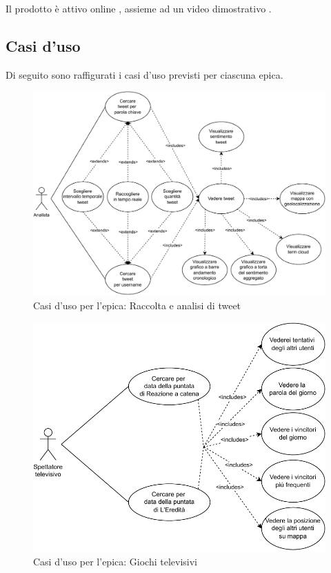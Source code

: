 \documentclass[11pt]{article}
\begin{document}
Il prodotto è attivo online \cite{deploy_prod}, assieme ad un video dimostrativo \cite{video}.

\newpage
\subsection{Casi d'uso}
Di seguito sono raffigurati i casi d'uso previsti per ciascuna epica.
\begin{figure}[H]
    \centering
    \includegraphics[scale=0.7]{./img/usecase/tweet.pdf}
    \caption{Casi d'uso per l'epica: Raccolta e analisi di tweet}
\end{figure}

\begin{figure}[H]
    \centering
    \includegraphics[scale=0.7]{./img/usecase/tvgames.pdf}
    \caption{Casi d'uso per l'epica: Giochi televisivi}
\end{figure}
\end{document}

